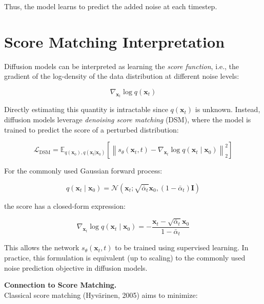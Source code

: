 Thus, the model learns to predict the added noise at each timestep.
\section{Score Matching Interpretation}

Diffusion models can be interpreted as learning the \textit{score function}, i.e., the gradient of the log-density of the data distribution at different noise levels:

\begin{equation}
\nabla_{\mathbf{x}_t} \log q(\mathbf{x}_t)
\end{equation}

Directly estimating this quantity is intractable since $q(\mathbf{x}_t)$ is unknown. Instead, diffusion models leverage \textit{denoising score matching} (DSM), where the model is trained to predict the score of a perturbed distribution:

\begin{equation}
\mathcal{L}_{\text{DSM}} =
\mathbb{E}_{q(\mathbf{x}_0), q(\mathbf{x}_t|\mathbf{x}_0)}
\left[
\left\|
s_\theta(\mathbf{x}_t, t)
-
\nabla_{\mathbf{x}_t}
\log q(\mathbf{x}_t \mid \mathbf{x}_0)
\right\|_2^2
\right]
\end{equation}

For the commonly used Gaussian forward process:

\begin{equation}
q(\mathbf{x}_t \mid \mathbf{x}_0) =
\mathcal{N}(\mathbf{x}_t; \sqrt{\bar{\alpha}_t}\mathbf{x}_0, (1-\bar{\alpha}_t)\mathbf{I})
\end{equation}

the score has a closed-form expression:

\begin{equation}
\nabla_{\mathbf{x}_t} \log q(\mathbf{x}_t \mid \mathbf{x}_0)
=
-\frac{\mathbf{x}_t - \sqrt{\bar{\alpha}_t}\mathbf{x}_0}{1 - \bar{\alpha}_t}
\end{equation}

This allows the network $s_\theta(\mathbf{x}_t, t)$ to be trained using supervised learning. In practice, this formulation is equivalent (up to scaling) to the commonly used noise prediction objective in diffusion models.

\vspace{0.5em}
\noindent
\textbf{Connection to Score Matching.} \\
Classical score matching (Hyvärinen, 2005) aims to minimize:

